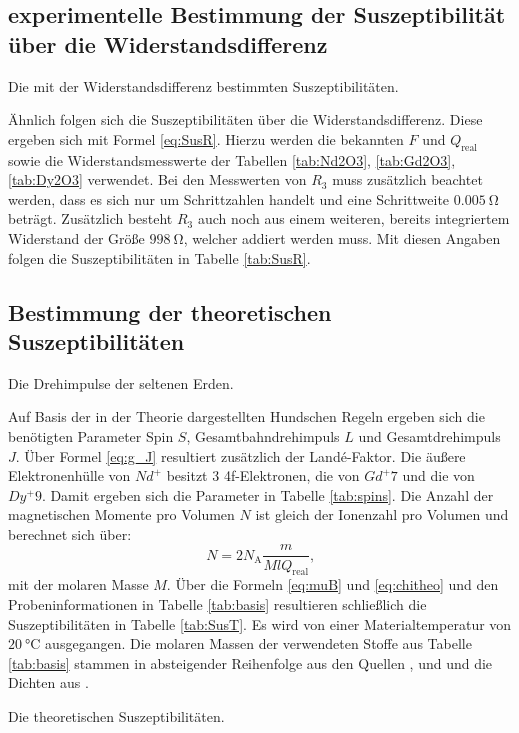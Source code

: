 \subsection{experimentelle Bestimmung der Suszeptibilität über die Widerstandsdifferenz}


\begin{table}
 \centering
 \caption{Die mit der Widerstandsdifferenz bestimmten Suszeptibilitäten.}
 
 \label{tab:SusR}
\end{table}


Ähnlich folgen sich die Suszeptibilitäten über die Widerstandsdifferenz. Diese ergeben sich mit Formel
\ref{eq:SusR}. Hierzu werden die bekannten $F$ und $Q_\text{real}$ sowie die Widerstandsmesswerte
der Tabellen \ref{tab:Nd2O3}, \ref{tab:Gd2O3}, \ref{tab:Dy2O3} verwendet.
Bei den Messwerten von $R_3$ muss zusätzlich beachtet werden, dass es sich nur
um Schrittzahlen handelt und eine Schrittweite $\SI{0.005}{\ohm}$ beträgt.
Zusätzlich besteht $R_3$ auch noch aus einem weiteren, bereits integriertem Widerstand
der Größe $\SI{998}{\ohm}$, welcher addiert werden muss. Mit diesen Angaben folgen die Suszeptibilitäten in Tabelle \ref{tab:SusR}.


\subsection{Bestimmung der theoretischen Suszeptibilitäten}

\begin{table}
 \centering
 \caption{Die Drehimpulse der seltenen Erden.}
 
 \label{tab:spins}
\end{table}


Auf Basis der in der Theorie dargestellten Hundschen Regeln ergeben sich die
benötigten Parameter Spin $S$, Gesamtbahndrehimpuls $L$ und Gesamtdrehimpuls $J$. Über Formel
\ref{eq:g_J} resultiert zusätzlich der Landé-Faktor. Die äußere Elektronenhülle von $Nd^+ $
besitzt 3 4f-Elektronen, die von $Gd^+ 7$ und die von
$Dy^+ 9$. Damit ergeben sich die Parameter in Tabelle \ref{tab:spins}.
Die Anzahl der magnetischen Momente pro Volumen $N$ ist gleich der Ionenzahl pro
Volumen und berechnet sich über:
\begin{equation}
  N = 2N_\text{A}\frac{m}{M l Q_\text{real}}\text{,}
\end{equation}
mit der molaren Masse $M$.
Über die Formeln \ref{eq:muB} und \ref{eq:chitheo} und den Probeninformationen in
Tabelle \ref{tab:basis} resultieren schließlich die Suszeptibilitäten in Tabelle \ref{tab:SusT}.
Es wird von einer Materialtemperatur von $\SI{20}{\degreeCelsius}$ ausgegangen. Die
molaren Massen der verwendeten Stoffe aus Tabelle \ref{tab:basis} stammen in
absteigender Reihenfolge aus den Quellen \cite{MNd2O3}, \cite{MGd2O3} und \cite{MDy2O3} und die Dichten aus \cite{V606}.

\begin{table}
 \centering
 \caption{Die theoretischen Suszeptibilitäten.}
 
 \label{tab:SusT}
\end{table}
